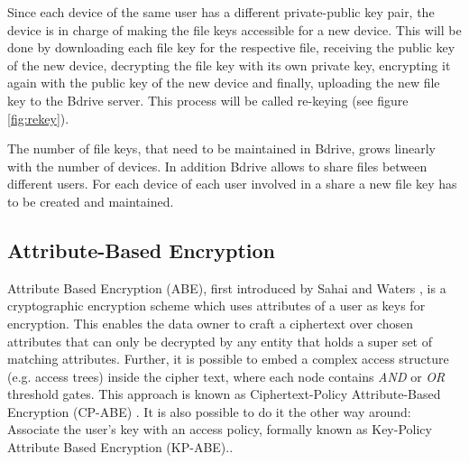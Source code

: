 \documentclass[twocolumn]{article}
\begin{document}
Since each device of the same user has a different private-public key pair, the device is in charge of making the file keys accessible for a new device. This will be done by downloading each file key for the respective file, receiving the public key of the new device, decrypting the file key with its own private key, encrypting it again with the public key of the new device and finally, uploading the new file key to the Bdrive server. This process will be called re-keying (see figure \ref{fig:rekey}).

The number of file keys, that need to be maintained in Bdrive, grows linearly with the number of devices. In addition Bdrive allows to share files between different users. For each device of each user involved in a share a new file key has to be created and maintained. 




\subsection{Attribute-Based Encryption}
Attribute Based Encryption (ABE), first introduced by Sahai and Waters \cite{sahai2005fuzzy}, is a cryptographic encryption scheme which uses attributes of a user as keys for encryption. This enables the data owner to craft a ciphertext over chosen attributes that can only be decrypted by any entity that holds a super set of matching attributes. Further, it is possible to embed a complex access structure (e.g. access trees) inside the cipher text, where each node contains \textit{AND} or \textit{OR} threshold gates. This approach is known as Ciphertext-Policy Attribute-Based Encryption (CP-ABE) \cite{bethencourt2007ciphertext}. 
It is also possible to do it the other way around: Associate the user's key with an access policy, formally known as Key-Policy Attribute Based Encryption (KP-ABE).\cite{goyal2006attribute}. 
\end{document}

